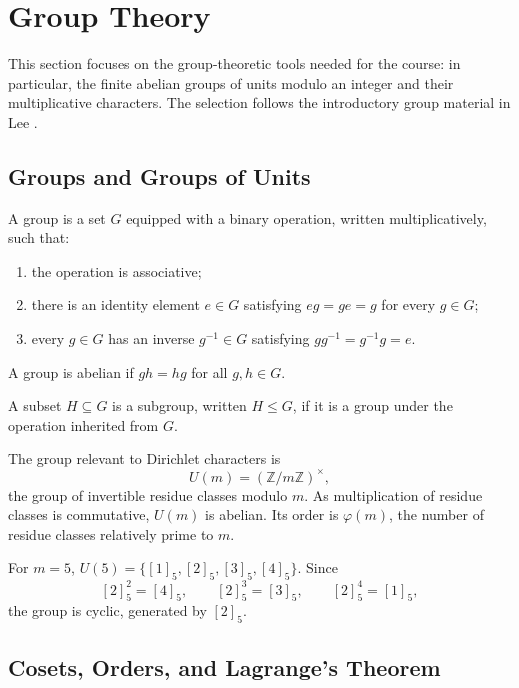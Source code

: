 \section{Group Theory}

This section focuses on the group-theoretic tools needed for the course: in particular, the finite abelian groups of units modulo an integer and their multiplicative characters. The selection follows the introductory group material in Lee \cite[Chapters 3--5]{Lee2018-aa}.

\subsection{Groups and Groups of Units}

\begin{definition}[Group]
A group is a set $G$ equipped with a binary operation, written multiplicatively, such that:
\begin{enumerate}
    \item the operation is associative;
    \item there is an identity element $e\in G$ satisfying $eg=ge=g$ for every $g\in G$;
    \item every $g\in G$ has an inverse $g^{-1}\in G$ satisfying $gg^{-1}=g^{-1}g=e$.
\end{enumerate}
A group is abelian if $gh=hg$ for all $g,h\in G$.
\end{definition}

\begin{definition}[Subgroup]
A subset $H\subseteq G$ is a subgroup, written $H\leq G$, if it is a group under the operation inherited from $G$.
\end{definition}

The group relevant to Dirichlet characters is
\[
 U(m)=(\mathbb{Z}/m\mathbb{Z})^{\times},
\]
the group of invertible residue classes modulo $m$. As multiplication of residue classes is commutative, $U(m)$ is abelian. Its order is $\varphi(m)$, the number of residue classes relatively prime to $m$.

\begin{example}
For $m=5$, $U(5)=\{[1]_5,[2]_5,[3]_5,[4]_5\}$. Since
\[
 [2]_5^2=[4]_5,\qquad [2]_5^3=[3]_5,\qquad [2]_5^4=[1]_5,
\]
the group is cyclic, generated by $[2]_5$.
\end{example}

\subsection{Cosets, Orders, and Lagrange's Theorem}

